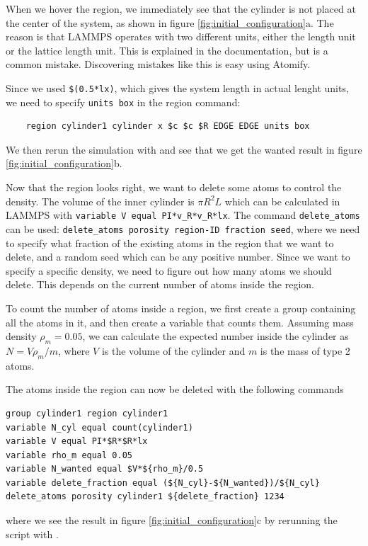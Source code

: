 \documentclass[12pt,a4paper,final]{iopart}
\newcommand{\code}[1]{\colorbox{light-gray}{\color{RawSienna}\texttt{#1}}}
\begin{document}
When we hover the region, we immediately see that the cylinder is not placed at the center of the system, as shown in figure \ref{fig:initial_configuration}a.
The reason is that LAMMPS operates with two different units, either the length unit or the lattice length unit. This is explained in the documentation, but is a common mistake.
Discovering mistakes like this is easy using Atomify.

Since we used \code{\$(0.5*lx)}, which gives the system length in actual lenght units, we need to specify \code{units box} in the region command:
\begin{lstlisting}
	region cylinder1 cylinder x $c $c $R EDGE EDGE units box
\end{lstlisting}
We then rerun the simulation with  and see that we get the wanted result in figure \ref{fig:initial_configuration}b.

Now that the region looks right, we want to delete some atoms to control the density.
The volume of the inner cylinder is $\pi R^2 L$ which can be calculated in LAMMPS with \code{variable V equal PI*v\_R*v\_R*lx}.
The command \code{delete\_atoms} can be used: \code{delete\_atoms porosity region-ID fraction seed},
where we need to specify what fraction of the existing atoms in the region that we want to delete, and a random seed which can be any positive number.
Since we want to specify a specific density, we need to figure out how many atoms we
should delete. This depends on the current number of atoms inside the region.

To count the number of atoms inside a region, we first create a group containing all the atoms in it, and then create a variable that counts them.
Assuming mass density $\rho_m = 0.05$, we can calculate the expected number inside the cylinder as $N = V\rho_m/m$,
where $V$ is the volume of the cylinder and $m$ is the mass of type 2 atoms.

The atoms inside the region can now be deleted with the following commands
\begin{lstlisting}
group cylinder1 region cylinder1
variable N_cyl equal count(cylinder1)
variable V equal PI*$R*$R*lx
variable rho_m equal 0.05
variable N_wanted equal $V*${rho_m}/0.5
variable delete_fraction equal (${N_cyl}-${N_wanted})/${N_cyl}
delete_atoms porosity cylinder1 ${delete_fraction} 1234
\end{lstlisting}
where we see the result in figure \ref{fig:initial_configuration}c by rerunning the script with .
\end{document}
